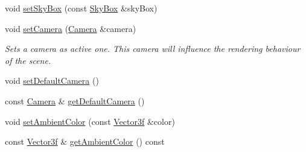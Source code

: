 \begin{DoxyCompactItemize}
void \hyperlink{classburn_1_1_scene_ae569a4b21af331b5403ca444d83e4884}{set\-Sky\-Box} (const \hyperlink{classburn_1_1_sky_box}{Sky\-Box} \&sky\-Box)
\item 
void \hyperlink{classburn_1_1_scene_adce745987dba9c9f85aa01cf46e2c0b4}{set\-Camera} (\hyperlink{classburn_1_1_camera}{Camera} \&camera)
\begin{DoxyCompactList}\small\item\em Sets a camera as active one. This camera will influence the rendering behaviour of the scene. \end{DoxyCompactList}\item 
void \hyperlink{classburn_1_1_scene_ac24973829efa8b630a72ca402f8aaa9e}{set\-Default\-Camera} ()
\item 
const \hyperlink{classburn_1_1_camera}{Camera} \& \hyperlink{classburn_1_1_scene_ad0b61929a473ee62467d040116a18e2d}{get\-Default\-Camera} ()
\item 
void \hyperlink{classburn_1_1_scene_a8bfd8a10ac26bd647b2391ff6c3b4b66}{set\-Ambient\-Color} (const \hyperlink{namespaceburn_afdd7cfb352b9612432faf6947b6fff74}{Vector3f} \&color)
\item 
const \hyperlink{namespaceburn_afdd7cfb352b9612432faf6947b6fff74}{Vector3f} \& \hyperlink{classburn_1_1_scene_a8abbd3b6bb1737c80366d059bbdc1ea5}{get\-Ambient\-Color} () const 
\end{DoxyCompactItemize}


